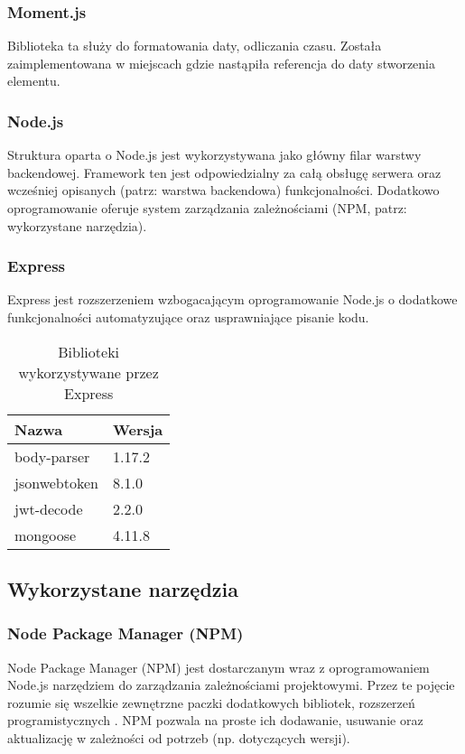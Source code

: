 \documentclass[eng,printmode]{mgr}
\begin{document}
\subsubsection{Moment.js}
Biblioteka ta \cite {MomentJS} służy do formatowania daty, odliczania czasu. Została zaimplementowana w miejscach gdzie nastąpiła referencja do daty stworzenia elementu.

\subsubsection{Node.js}
Struktura oparta o Node.js \cite {NodeJS} jest wykorzystywana jako główny filar warstwy backendowej. Framework ten jest odpowiedzialny za całą obsługę serwera oraz wcześniej opisanych (patrz: warstwa backendowa) funkcjonalności. Dodatkowo oprogramowanie oferuje system zarządzania zależnościami (NPM, patrz: wykorzystane narzędzia).

\subsubsection{Express}
Express \cite {Express} jest rozszerzeniem wzbogacającym oprogramowanie Node.js o dodatkowe funkcjonalności automatyzujące oraz usprawniające pisanie kodu.

\begin{table}[H]
\begin{tabularx}{\textwidth}{|X|X|}
   \hline
    \textbf{Nazwa} & \textbf{Wersja} \\
   \hline
     body-parser & 1.17.2 \\
   \hline
     jsonwebtoken & 8.1.0 \\
   \hline
  	 jwt-decode & 2.2.0 \\
   \hline
   	 mongoose & 4.11.8 \\
   \hline
\end{tabularx}
\caption{Biblioteki wykorzystywane przez Express}
\end{table}

\subsection{Wykorzystane narzędzia}

\subsubsection{Node Package Manager (NPM)}
Node Package Manager (NPM) \cite {NPM} jest dostarczanym wraz z oprogramowaniem Node.js narzędziem do zarządzania zależnościami projektowymi. Przez te pojęcie rozumie się wszelkie zewnętrzne paczki dodatkowych bibliotek, rozszerzeń programistycznych . NPM pozwala na proste ich dodawanie, usuwanie oraz aktualizację w zależności od potrzeb (np. dotyczących wersji).
\end{document}
